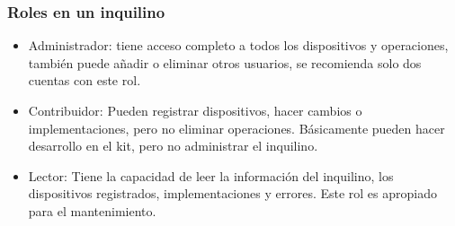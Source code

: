 \subsubsection{Roles en un inquilino}
\begin{itemize}
	\item 
	Administrador: tiene acceso completo a todos los dispositivos y operaciones, también puede añadir o eliminar otros usuarios, se recomienda solo dos cuentas con este rol.
	\item 
	Contribuidor: Pueden registrar dispositivos, hacer cambios o implementaciones, pero no eliminar operaciones. Básicamente pueden hacer desarrollo en el kit, pero no administrar el inquilino.
	\item 
	Lector: Tiene la capacidad de leer la información del inquilino, los dispositivos registrados, implementaciones y errores. Este rol es apropiado para el mantenimiento.
	
\end{itemize}
